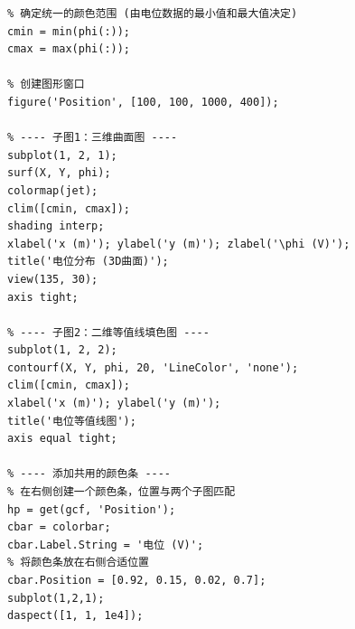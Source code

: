 \documentclass{../ElectromagneticFieldTemplate}
\begin{document}
\begin{verbatim}
% 确定统一的颜色范围 (由电位数据的最小值和最大值决定)
cmin = min(phi(:));
cmax = max(phi(:));

% 创建图形窗口
figure('Position', [100, 100, 1000, 400]);

% ---- 子图1：三维曲面图 ----
subplot(1, 2, 1);
surf(X, Y, phi);
colormap(jet);
clim([cmin, cmax]);
shading interp;
xlabel('x (m)'); ylabel('y (m)'); zlabel('\phi (V)');
title('电位分布 (3D曲面)');
view(135, 30);
axis tight;

% ---- 子图2：二维等值线填色图 ----
subplot(1, 2, 2);
contourf(X, Y, phi, 20, 'LineColor', 'none');
clim([cmin, cmax]);
xlabel('x (m)'); ylabel('y (m)');
title('电位等值线图');
axis equal tight;

% ---- 添加共用的颜色条 ----
% 在右侧创建一个颜色条，位置与两个子图匹配
hp = get(gcf, 'Position');
cbar = colorbar;
cbar.Label.String = '电位 (V)';
% 将颜色条放在右侧合适位置
cbar.Position = [0.92, 0.15, 0.02, 0.7];
subplot(1,2,1);
daspect([1, 1, 1e4]);   
\end{verbatim}
\end{document}
